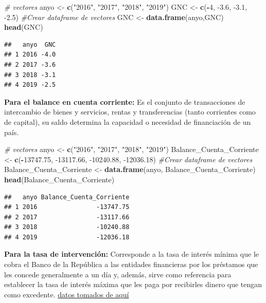 \documentclass[
  11pt,
]{book}
\newenvironment{Shaded}{\begin{snugshade}}{\end{snugshade}}
\newcommand{\CommentTok}[1]{\textcolor[rgb]{0.56,0.35,0.01}{\textit{#1}}}
\newcommand{\DecValTok}[1]{\textcolor[rgb]{0.00,0.00,0.81}{#1}}
\newcommand{\FloatTok}[1]{\textcolor[rgb]{0.00,0.00,0.81}{#1}}
\newcommand{\KeywordTok}[1]{\textcolor[rgb]{0.13,0.29,0.53}{\textbf{#1}}}
\newcommand{\NormalTok}[1]{#1}
\newcommand{\OperatorTok}[1]{\textcolor[rgb]{0.81,0.36,0.00}{\textbf{#1}}}
\newcommand{\StringTok}[1]{\textcolor[rgb]{0.31,0.60,0.02}{#1}}
\begin{document}
\begin{Shaded}
\begin{Highlighting}[]
\CommentTok{# vectores }
\NormalTok{anyo <-}\StringTok{ }\KeywordTok{c}\NormalTok{(}\StringTok{"2016"}\NormalTok{, }\StringTok{"2017"}\NormalTok{, }\StringTok{"2018"}\NormalTok{, }\StringTok{"2019"}\NormalTok{)}
\NormalTok{GNC <-}\StringTok{ }\KeywordTok{c}\NormalTok{(}\OperatorTok{-}\DecValTok{4}\NormalTok{, }\FloatTok{-3.6}\NormalTok{, }\FloatTok{-3.1}\NormalTok{, }\FloatTok{-2.5}\NormalTok{)}
\CommentTok{#Crear dataframe de vectores}
\NormalTok{GNC <-}\StringTok{ }\KeywordTok{data.frame}\NormalTok{(anyo,GNC)}
\KeywordTok{head}\NormalTok{(GNC)}
\end{Highlighting}
\end{Shaded}

\begin{verbatim}
##   anyo  GNC
## 1 2016 -4.0
## 2 2017 -3.6
## 3 2018 -3.1
## 4 2019 -2.5
\end{verbatim}

\textbf{Para el balance en cuenta corriente:} Es el conjunto de
transacciones de intercambio de bienes y servicios, rentas y
transferencias (tanto corrientes como de capital), su saldo determina la
capacidad o necesidad de financiación de un país.

\begin{Shaded}
\begin{Highlighting}[]
\CommentTok{# vectores }
\NormalTok{anyo <-}\StringTok{ }\KeywordTok{c}\NormalTok{(}\StringTok{"2016"}\NormalTok{, }\StringTok{"2017"}\NormalTok{, }\StringTok{"2018"}\NormalTok{, }\StringTok{"2019"}\NormalTok{)}
\NormalTok{Balance_Cuenta_Corriente <-}\StringTok{ }\KeywordTok{c}\NormalTok{(}\OperatorTok{-}\FloatTok{13747.75}\NormalTok{, }\FloatTok{-13117.66}\NormalTok{, }\FloatTok{-10240.88}\NormalTok{, }\FloatTok{-12036.18}\NormalTok{)}
\CommentTok{#Crear dataframe de vectores}
\NormalTok{Balance_Cuenta_Corriente <-}\StringTok{ }\KeywordTok{data.frame}\NormalTok{(anyo, Balance_Cuenta_Corriente)}
\KeywordTok{head}\NormalTok{(Balance_Cuenta_Corriente)}
\end{Highlighting}
\end{Shaded}

\begin{verbatim}
##   anyo Balance_Cuenta_Corriente
## 1 2016                -13747.75
## 2 2017                -13117.66
## 3 2018                -10240.88
## 4 2019                -12036.18
\end{verbatim}

\textbf{Para la tasa de intervención:} Corresponde a la tasa de interés
mínima que le cobra el Banco de la República a las entidades financieras
por los préstamos que les concede generalmente a un día y, además, sirve
como referencia para establecer la tasa de interés máxima que les paga
por recibirles dinero que tengan como excedente.
\href{https://www.banrep.gov.co/es/estadisticas/tasas-interes-politica-monetaria}{datos
tomados de aquí}
\end{document}
